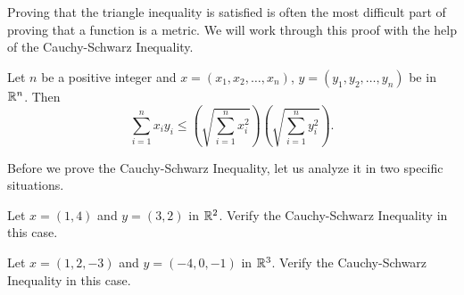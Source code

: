 {\begin{comment}
\item Since $(x_i-y_i)^2 = (y_i-x_i)^2$ for each $i$, we have 
\[d_E(x,y) =  \sqrt{\sum_{i=1}^n (x_i-y_i)^2} = \sqrt{\sum_{i=1}^n (y_i-x_i)^2} = d_E(y,x).\] 

\item If $x = y$, then $x_i = y_i$ and $x_i-y_i = 0$ for each $i$ . Then
\[d_E(x,y) =  \sqrt{\sum_{i=1}^n (x_i-y_i)^2} =  \sqrt{\sum_{i=1}^n 0} = 0.\] 

\item Suppose $d_E(x,y) = 0$. If $x_k \neq y_k$ for some $k$, then $(x_k - y_k)^2 > 0$. This makes
\[d_E(x,y) =  \sqrt{\sum_{i=1}^n (x_i-y_i)^2} =  \sqrt{\sum_{i \neq k} (x_i-y_i)^2 + (x_k-y_k)^2} \geq \sqrt{0 +  (x_k-y_k)^2} > 0.\]
So we must have $x_i = y_i$ for every $i$ and $x=y$. 

\ea

\end{comment}

Proving that the triangle inequality is satisfied is often the most difficult part of proving that a function is a metric. We will work through this proof with the help of the Cauchy-Schwarz Inequality. 

\begin{lemma} \label{lem:CS_Euclidean} Let $n$ be a positive integer and $x = (x_1, x_2, \ldots, x_n)$, $y=(y_1, y_2, \ldots, y_n)$ be in $\mathbb{R}^n$. Then 
\begin{equation} \label{eq:SL}
\sum_{i=1}^n x_iy_i \leq  \left(\sqrt{\sum_{i=1}^n x_i^2}\right) \left(\sqrt{\sum_{i=1}^n y_i^2}\right).
\end{equation} 
\end{lemma}

\begin{activity} Before we prove the Cauchy-Schwarz Inequality, let us analyze it in two specific situations.
	\ba
	\item Let $x=(1,4)$ and $y = (3,2)$ in $\mathbb{R}^2$. Verify the Cauchy-Schwarz Inequality in this case.

	\item Let $x=(1,2, -3)$ and $y = (-4, 0, -1)$ in $\mathbb{R}^3$. Verify the Cauchy-Schwarz Inequality in this case.

	\ea
\end{activity}

\begin{comment}

\ActivitySolution
	\ba
	\item Here we have 
	\[\sum_{i=1}^2 x_iy_i = (1)(3) + (4)(2) = 11\]
	and
	\[\left(\sqrt{\sum_{i=1}^2 x_i^2}\right) \left(\sqrt{\sum_{i=1}^2 y_i^2}\right) = \sqrt{1+9}\sqrt{16+4} = \sqrt{200} \approx 14.1.\]


\end{comment}}
